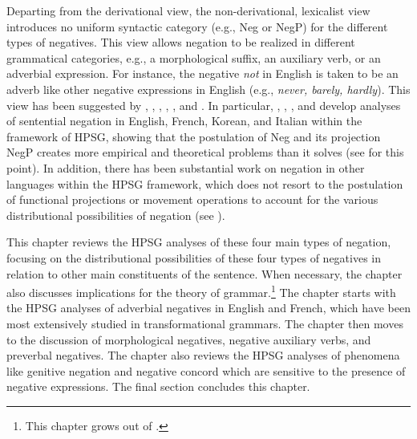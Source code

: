 \documentclass[output=paper
                ,modfonts
                ,nonflat
	        ,collection
	        ,collectionchapter
	        ,collectiontoclongg
 	        ,biblatex
                ,babelshorthands
                ,newtxmath
                ,draftmode
                ,colorlinks, citecolor=brown
]{./langsci/langscibook}
\begin{document}
{Departing from the derivational view, the non-derivational, lexicalist view
introduces no uniform syntactic category (e.g., Neg or NegP) for the different types of negatives. This view allows negation to be realized in different grammatical categories, e.g., a morphological suffix, an auxiliary verb, or an adverbial expression. For instance, the negative \emph{not} in English is taken to be an adverb like other negative expressions in English (e.g., \textit{never, barely, hardly}). This view has been suggested by \citet{Jackendoff:72}, \citet{Baker:91}, \citet{Ernst:92}, \citet{AG:97}, \citet{Kim:00}, and \citet{Warner2000a-u}. In particular,
\citet{KS:96}, \citet{AG:97}, \citet{Kim:00}, and \citet{KS:02} develop analyses of sentential negation in English, French, Korean, and Italian within the framework of HPSG, showing that the postulation of Neg and its projection NegP creates more empirical and theoretical problems than it solves (see \citealt{Newmeyer:2006} for this point).
In addition, there has been substantial work on negation in other languages within the HPSG framework, which
does not resort to the postulation of functional projections or movement operations to account for the various distributional possibilities
of negation (see \citealt{PK:99, BJ:00, Prz:00, Kupsc:02, Swart:02, Borsley:05, Crysmann:10, Bender:13}).

This chapter reviews the HPSG analyses of these four main types of negation,
focusing on the distributional possibilities of these four types of negatives in
relation to other main constituents of the sentence. When
necessary, the chapter also discusses implications for
the theory of grammar.\footnote{This chapter grows out of \citet{Kim:00,kim:18}.} The
chapter starts with the HPSG analyses of adverbial negatives in English and French, which have been most extensively studied in transformational grammars.
The chapter then moves to the discussion of morphological
negatives, negative auxiliary verbs, and preverbal negatives. The chapter
also reviews the HPSG analyses of phenomena like genitive negation and
negative concord which are sensitive to the presence of negative expressions. The
final section concludes this chapter.


}
\end{document}
